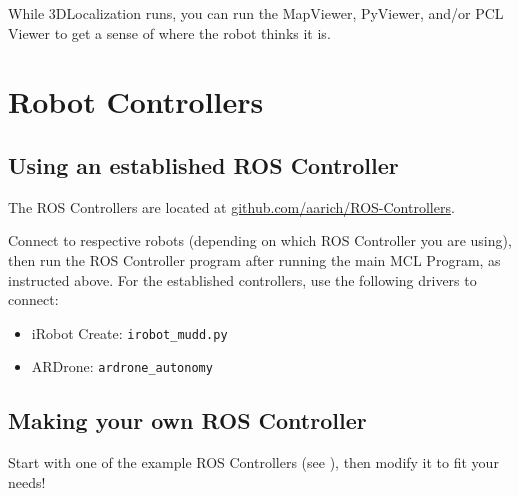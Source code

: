 \documentclass[11pt]{article}
\begin{document}
While 3DLocalization runs, you can run the MapViewer, PyViewer, and/or PCL Viewer to get a sense of where the robot thinks it is.

\section{Robot Controllers}
\subsection{Using an established ROS Controller}
The ROS Controllers are located at \url{github.com/aarich/ROS-Controllers}.

Connect to respective robots (depending on which ROS Controller you are using), then run the ROS Controller program after running the main MCL Program, as instructed above. For the established controllers, use the following drivers to connect:
\begin{itemize}
\item iRobot Create: \verb,irobot_mudd.py,
\item ARDrone: \verb.ardrone_autonomy.
\end{itemize}

\subsection{Making your own ROS Controller}
Start with one of the example ROS Controllers (see ), then modify it to fit your needs!
\end{document}
